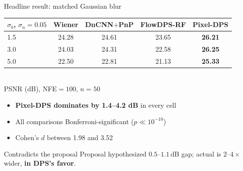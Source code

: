 \documentclass[10pt,aspectratio=169]{beamer}
\begin{document}
\begin{frame}{Headline result: matched Gaussian blur}
  \begin{table}
    \centering
    \small
    \begin{tabular}{lcccc}
      \toprule
      $\sigma_b$, $\sigma_n{=}0.05$ & Wiener & DnCNN$+$PnP & FlowDPS-RF & \textbf{Pixel-DPS} \\
      \midrule
      1.5 & 24.28 & 24.61 & 23.65 & \textbf{26.21} \\
      3.0 & 24.03 & 24.31 & 22.58 & \textbf{26.25} \\
      5.0 & 22.50 & 22.81 & 21.13 & \textbf{25.33} \\
      \bottomrule
    \end{tabular}
    \\
    \footnotesize PSNR (dB), NFE${=}100$, $n{=}50$
  \end{table}

  \begin{itemize}
    \item \textbf{Pixel-DPS dominates by 1.4--4.2 dB} in every cell
    \item All comparisons Bonferroni-significant ($p \ll 10^{-10}$)
    \item Cohen's $d$ between 1.98 and 3.52
  \end{itemize}

  \begin{alertblock}{Contradicts the proposal}
    Proposal hypothesized $0.5$--$1.1$\,dB gap; actual is
    $2$--$4{\times}$ wider, \textbf{in DPS's favor}.
  \end{alertblock}

\end{frame}
\end{document}
